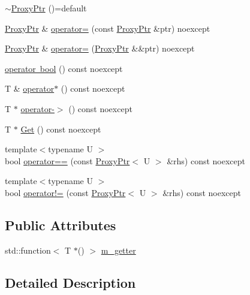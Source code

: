\begin{DoxyCompactItemize}
\mbox{\hyperlink{classmage_1_1_proxy_ptr_a7f8989f9214bbc1cd94295c796cfbb9a}{$\sim$\+Proxy\+Ptr}} ()=default
\item 
\mbox{\hyperlink{classmage_1_1_proxy_ptr}{Proxy\+Ptr}} \& \mbox{\hyperlink{classmage_1_1_proxy_ptr_a2d3a3a7595028a72a97a2c2131947a8d}{operator=}} (const \mbox{\hyperlink{classmage_1_1_proxy_ptr}{Proxy\+Ptr}} \&ptr) noexcept
\item 
\mbox{\hyperlink{classmage_1_1_proxy_ptr}{Proxy\+Ptr}} \& \mbox{\hyperlink{classmage_1_1_proxy_ptr_a53e38a57d8155b8cd59b3d6e332995b7}{operator=}} (\mbox{\hyperlink{classmage_1_1_proxy_ptr}{Proxy\+Ptr}} \&\&ptr) noexcept
\item 
\mbox{\hyperlink{classmage_1_1_proxy_ptr_ac1226dcf54a735bb5da12273c38e9b8f}{operator bool}} () const noexcept
\item 
T \& \mbox{\hyperlink{classmage_1_1_proxy_ptr_aaf7b96ea7e8350ce5f2ae1f504627fd9}{operator$\ast$}} () const noexcept
\item 
T $\ast$ \mbox{\hyperlink{classmage_1_1_proxy_ptr_af33f20a43615df2328d7436ff3145d54}{operator-\/$>$}} () const noexcept
\item 
T $\ast$ \mbox{\hyperlink{classmage_1_1_proxy_ptr_a9af6f8e3b1f1aa9d5b323ed01fb9b40d}{Get}} () const noexcept
\item 
{\footnotesize template$<$typename U $>$ }\\bool \mbox{\hyperlink{classmage_1_1_proxy_ptr_a786d92c5d87ac0349a60cf99642bd890}{operator==}} (const \mbox{\hyperlink{classmage_1_1_proxy_ptr}{Proxy\+Ptr}}$<$ U $>$ \&rhs) const noexcept
\item 
{\footnotesize template$<$typename U $>$ }\\bool \mbox{\hyperlink{classmage_1_1_proxy_ptr_a14c1832a1f6b48c69337931d49bf3676}{operator!=}} (const \mbox{\hyperlink{classmage_1_1_proxy_ptr}{Proxy\+Ptr}}$<$ U $>$ \&rhs) const noexcept
\end{DoxyCompactItemize}
\subsection*{Public Attributes}
\begin{DoxyCompactItemize}
\item 
std\+::function$<$ T $\ast$() $>$ \mbox{\hyperlink{classmage_1_1_proxy_ptr_a78fad290d478eb55285d4ab01cda1669}{m\+\_\+getter}}
\end{DoxyCompactItemize}


\subsection{Detailed Description}
